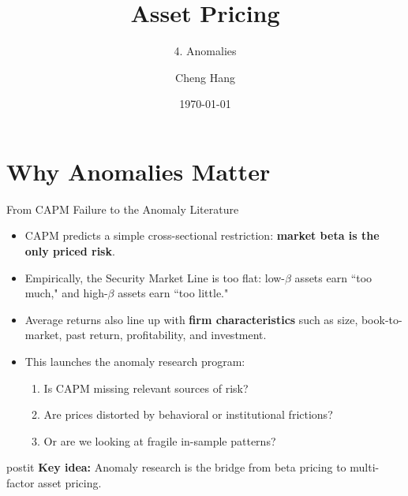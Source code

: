 \documentclass{beamer}
\title[Asset Pricing]{\textbf{Asset Pricing}}
\subtitle{4. Anomalies}
\author[Cheng Hang]{Cheng Hang}
\institute[DUFE]
{School of Fintech \\
	Dongbei University of Finance \& Economics \\
	\medskip
	\textbf{chenghangch@qq.com}
}
\date{\today}
\begin{document}
\begin{frame}
	\titlepage
\end{frame}

\section{Why Anomalies Matter}

\begin{frame}{From CAPM Failure to the Anomaly Literature}
	\begin{itemize}
		\item CAPM predicts a simple cross-sectional restriction: \textbf{market beta is the only priced risk}.
		\item Empirically, the Security Market Line is too flat: low-$\beta$ assets earn ``too much," and high-$\beta$ assets earn ``too little."
		\item Average returns also line up with \textbf{firm characteristics} such as size, book-to-market, past return, profitability, and investment.
		\item This launches the anomaly research program:
		\begin{enumerate}
			\item Is CAPM missing relevant sources of risk?
			\item Are prices distorted by behavioral or institutional frictions?
			\item Or are we looking at fragile in-sample patterns?
		\end{enumerate}
	\end{itemize}

	\vspace{0.4cm}
	\begin{beamercolorbox}[sep=0.5em,wd=\linewidth,rounded=true,shadow=true]{postit}
		\textbf{Key idea:} Anomaly research is the bridge from beta pricing to multi-factor asset pricing.
	\end{beamercolorbox}
\end{frame}
\end{document}
